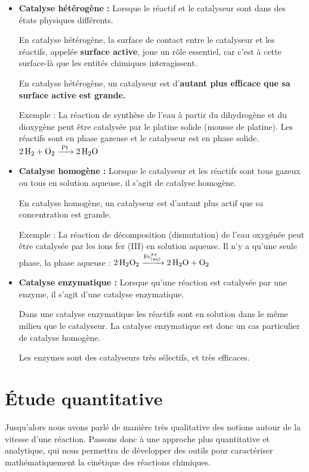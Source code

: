 \documentclass[11pt,a4paper]{article}
\begin{document}
\begin{itemize}
    \item \textbf{Catalyse hétérogène : } Lorsque le réactif et le catalyseur sont dans des états physiques différents. 
    
    En catalyse hétérogène, la surface de contact entre le catalyseur et les réactifs, appelée \textbf{surface active}, joue un rôle essentiel, car c’est à cette surface-là que les entités chimiques interagissent. 
    
    En catalyse hétérogène, un catalyseur est d’\textbf{autant plus efficace que sa surface active est grande. }
    
    Exemple : La réaction de synthèse de l'eau à partir du dihydrogène et du dioxygène peut être catalysée par le platine solide (mousse de platine). Les réactifs sont en phase gazeuse et le catalyseur est en phase solide. $\ce{2 H2 + O2 ->[Pt] 2 H2O }$
    
    \item \textbf{Catalyse homogène : } Lorsque le catalyseur et les réactifs sont tous gazeux ou tous en solution aqueuse, il s’agit de catalyse homogène. 
    
    En catalyse homogène, un catalyseur est d’autant plus actif que sa concentration est grande. 
    
    Exemple :  La réaction de décomposition (dismutation) de l'eau oxygénée peut être catalysée par les ions fer (III) en solution aqueuse. Il n’y a qu'une seule phase, la phase aqueuse : $\ce{2 H2O2 ->[Fe^{3+}_{(aq)}] 2 H2O + O2}$
    \item \textbf{Catalyse enzymatique : }Lorsque qu’une réaction est catalysée par une enzyme, il s’agit d’une catalyse enzymatique.
    
    Dans une catalyse enzymatique les réactifs sont en solution dans le même milieu que le catalyseur. La catalyse enzymatique est donc un cas particulier de catalyse homogène. 
    
    Les enzymes sont des catalyseurs très sélectifs, et très efficaces. 
\end{itemize}
	
\section{Étude quantitative}

Jusqu'alors nous avons parlé de manière très qualitative des notions autour de la vitesse d'une réaction. Passons donc à une approche plus quantitative et analytique, qui nous permettra de développer des outils pour caractériser mathématiquement la cinétique des réactions chimiques. 
\end{document}
